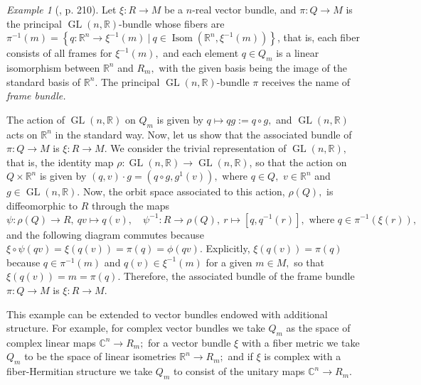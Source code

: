 \documentclass[12pt, letterpaper, reqno]{amsart}
\theoremstyle{definition}
\theoremstyle{plain}
\theoremstyle{remark}
\newtheorem{ex}{Example}
\begin{document}
\begin{ex}[\cite{montgomery2002tour}, p. 210]
	\sloppy Let $ \xi: R \rightarrow M $ be a $n$-real vector bundle, and $ \pi: Q \rightarrow M $ is the principal $ \operatorname{GL}(n, \mathbb{R})  $-bundle whose fibers are $ \pi^{-1}(m) = \left\{ q: \mathbb{R}^n \rightarrow \xi^{-1}(m) \ | \ q\in \operatorname{Isom}( \mathbb{R}^n, \xi^{-1}(m)) \right\}  $, that is, each fiber consists of all frames for $ \xi^{-1}(m), $ and each element $ q\in Q_m $ is a linear isomorphism between $ \mathbb{R}^n $ and $ R_m, $ with the given basis being the image of the standard basis of $ \mathbb{R}^n. $ The principal $ \operatorname{GL} (n, \mathbb{R}) $-bundle $ \pi $ receives the name of \textit{frame bundle.} 

	The action of $ \operatorname{GL} (n, \mathbb{R})$ on $ Q_m $ is given by $ q\mapsto qg:=q\circ g, $ and $ \operatorname{GL} (n, \mathbb{R}) $ acts on $ \mathbb{R}^n $ in the standard way. Now, let us show that the associated bundle of $ \pi: Q \rightarrow M $ is $ \xi: R \rightarrow M. $ We consider the trivial representation of $ \operatorname{GL} (n, \mathbb{R}), $ that is, the identity map $ \rho: \operatorname{GL} (n, \mathbb{R}) \rightarrow \operatorname{GL} (n, \mathbb{R}) $, so that the action on $ Q \times \mathbb{R}^n$ is given by $ (q,v)\cdot g = (q\circ g, g^{1}(v)),$ where $ q\in Q, $ $ v\in \mathbb{R}^n $ and $ g\in \operatorname{GL} (n, \mathbb{R}). $ Now, the orbit space associated to this action, $ \rho(Q), $ is diffeomorphic to $ R $ through the maps
	$$ \psi: \rho(Q) \rightarrow R, \ qv\mapsto q(v), \quad \psi^{-1}: R \rightarrow \rho(Q), \ r \mapsto [q,q^{-1}(r)], \text{ where }q\in \pi^{-1}(\xi(r)), $$ 
	and the following diagram commutes because $ \xi\circ \psi(qv)=\xi(q(v))=\pi(q)=\phi(qv).$ Explicitly, $ \xi(q(v))=\pi(q) $ because $ q\in\pi^{-1}(m) $ and $ q(v)\in \xi^{-1}(m) $ for a given $ m\in M, $ so that $ \xi(q(v))=m=\pi(q). $ Therefore, the associated bundle of the frame bundle $ \pi: Q \rightarrow M $ is $ \xi : R \rightarrow M. $ 
	\begin{center}
	\end{center}

	This example can be extended to vector bundles endowed with additional structure. For example, for complex vector bundles we take $ Q_m $ as the space of complex linear maps $ \mathbb{C}^n \rightarrow  R_m; $ for a vector bundle $ \xi $ with a fiber metric we take $ Q_m $ to be the space of linear isometries $ \mathbb{R}^n \rightarrow R_m; $ and if $ \xi $ is complex with a fiber-Hermitian structure we take $ Q_m $ to consist of the unitary maps $ \mathbb{C}^n \rightarrow R_m. $ 
\end{ex}
\end{document}
